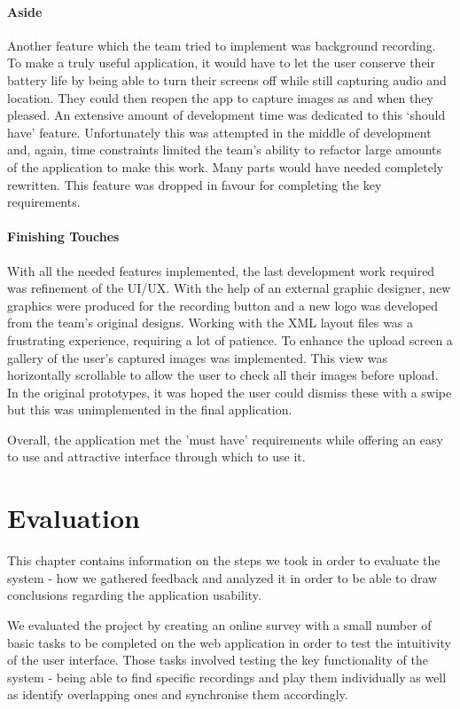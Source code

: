 \documentclass{l3proj}
\begin{document}
\subsubsection{Aside}
Another feature which the team tried to implement was background recording. To make a truly useful application, it would have to let the user conserve their battery life by being able to turn their screens off while still capturing audio and location. They could then reopen the app to capture images as and when they pleased. An extensive amount of development time was dedicated to this ‘should have’ feature. Unfortunately this was attempted in the middle of development and, again, time constraints limited the team's ability to refactor large amounts of the application to make this work. Many parts would have needed completely rewritten. This feature was dropped in favour for completing the key requirements.

\subsubsection{Finishing Touches}
With all the needed features implemented, the last development work required was refinement of the UI/UX. With the help of an external graphic designer, new graphics were produced for the recording button and a new logo was developed from the team's original designs. Working with the XML layout files was a frustrating experience, requiring a lot of patience. To enhance the upload screen a gallery of the user's captured images was implemented. This view was horizontally scrollable to allow the user to check all their images before upload. In the original prototypes, it was hoped the user could dismiss these with a swipe but this was unimplemented in the final application.

Overall, the application met the 'must have' requirements while offering an easy to use and attractive interface through which to use it.

\chapter{Evaluation}

This chapter contains information on the steps we took in order to evaluate the system - how we gathered feedback and analyzed it in order to be able to draw conclusions regarding the application usability.

We evaluated the project by creating an online survey with a small number of basic tasks to be completed on the web application in order to test the intuitivity of the user interface.
Those tasks involved testing the key functionality of the system - being able to find specific recordings and play them individually as well as identify overlapping ones and synchronise them accordingly.
\end{document}
